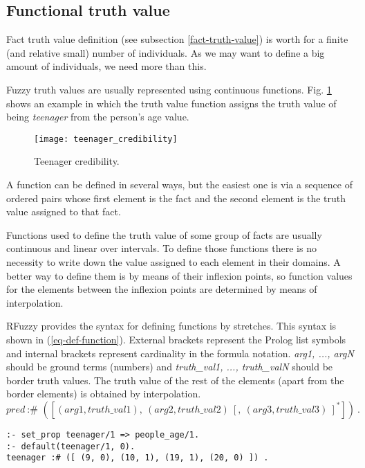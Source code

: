 \documentclass[runningheads,a4paper]{llncs}
\begin{document}
\subsection{Functional truth value}
\label{functional-truth-value}

Fact truth value definition (see subsection \ref{fact-truth-value}) 
is worth for a finite (and relative small) number of individuals.
As we may want to define a big amount of individuals, we need
more than this.

Fuzzy truth values are usually represented using continuous
functions. 
Fig. \ref{fig:teenager_credibility} shows an example in which 
the truth value function assigns the truth value of being 
{\it teenager} from the person's age value.

\begin{figure}
\centering
\texttt{[image: teenager\_credibility]} 
\caption{Teenager credibility.}
\label{fig:teenager_credibility}
\end{figure}


A function can be defined in several ways, but the easiest one is 
via a sequence of ordered pairs whose first element is the fact and the second element is the truth value 
assigned to that fact. 

Functions used to define the truth value of some group 
of facts are usually continuous and linear over intervals.
To define those functions there is no necessity to write down 
the value assigned to each element in their domains.
A better way to define them is by means of their
inflexion points, so function values for the elements between 
the inflexion points are determined by means of interpolation.

RFuzzy provides the syntax for defining functions by stretches. 
This syntax is shown in (\ref{eq-def-function}).
External brackets represent the Prolog list symbols and 
internal brackets represent cardinality in the formula notation. 
{\it arg1, ..., argN} should be ground terms (numbers) and {\it
truth\_val1, ..., truth\_valN} should be border truth values. The
truth value of the rest of the elements (apart from the border
elements) is obtained by interpolation.
\begin{equation}
pred\ \textbf{:\#\ }([ (arg1, truth\_val1),\ (arg2, truth\_val2)\ [,\ (arg3, truth\_val3)\ ]^* ])\ .
\label{eq-def-function}
\end{equation}

\begin{verbatim}
:- set_prop teenager/1 => people_age/1.
:- default(teenager/1, 0).
teenager :# ([ (9, 0), (10, 1), (19, 1), (20, 0) ]) .
\end{verbatim}
\end{document}
